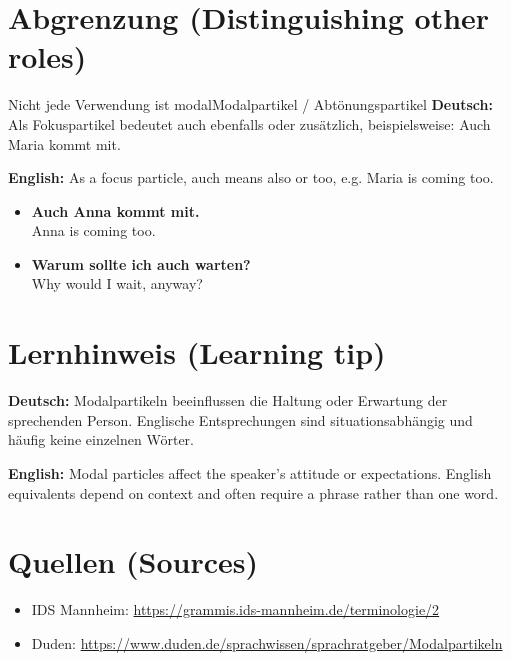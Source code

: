 \documentclass[a4paper,11pt]{article}
\newcommand{\GermanText}[1]{\textbf{Deutsch: }#1\par}
\newcommand{\EnglishText}[1]{{\small\color{SoftGray}\textbf{English: }#1\par}}
\newcommand{\ExampleItem}[2]{\item \textbf{#1}\\{\small\color{SoftGray}#2}}
\begin{document}
\section{Abgrenzung \textnormal{(Distinguishing other roles)}}
\begin{grammarentry}{Nicht jede Verwendung ist modal}{Modalpartikel / Abtönungspartikel}
\GermanText{Als Fokuspartikel bedeutet auch ebenfalls oder zusätzlich, beispielsweise: Auch Maria kommt mit.}
\EnglishText{As a focus particle, auch means also or too, e.g. Maria is coming too.}
\end{grammarentry}
\begin{exbox}\begin{itemize}
\ExampleItem{Auch Anna kommt mit.}{Anna is coming too.}
\ExampleItem{Warum sollte ich auch warten?}{Why would I wait, anyway?}
\end{itemize}\end{exbox}
\section{Lernhinweis \textnormal{(Learning tip)}}
\GermanText{Modalpartikeln beeinflussen die Haltung oder Erwartung der sprechenden Person. Englische Entsprechungen sind situationsabhängig und häufig keine einzelnen Wörter.}
\EnglishText{Modal particles affect the speaker's attitude or expectations. English equivalents depend on context and often require a phrase rather than one word.}
\section{Quellen \textnormal{(Sources)}}
\begin{itemize}
\item IDS Mannheim: \url{https://grammis.ids-mannheim.de/terminologie/2}
\item Duden: \url{https://www.duden.de/sprachwissen/sprachratgeber/Modalpartikeln}
\end{itemize}
\end{document}
